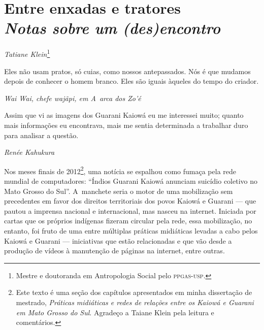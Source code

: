 \thispagestyle{empty}

\chapter*{Entre enxadas e tratores\\ 
\large{\emph{Notas sobre um (des)encontro}}}


\begin{flushright}
\emph{Tatiane Klein}\footnote{Mestre e doutoranda em Antropologia Social pelo
\textsc{ppgas}-\textsc{usp}.}
\end{flushright}

\epigraph{Eles não usam pratos, só cuias, como nossos antepassados. Nós é que
mudamos depois de conhecer o homem branco. Eles são iguais àqueles do
tempo do criador.}{\emph{Wai Wai, chefe wajãpi, em \emph{A~arca dos Zo’é}}}

\begin{samepage}
\epigraph{Assim que vi as imagens dos Guarani Kaiowá eu me interessei muito;
quanto mais informações eu encontrava, mais me sentia determinada a
trabalhar duro para analisar a questão.\footnotemark[2]}{\emph{Renée Kahukura}\footnotemark[3]}
\nopagebreak
\noindent Nos meses finais de 2012\footnote[4]{Este texto é uma seção dos capítulos
apresentados em minha dissertação de mestrado, \emph{Práticas midiáticas e
redes de relações entre os Kaiowá e Guarani em Mato Grosso do Sul}.
Agradeço a Taiane Klein pela leitura e comentários.}, uma notícia se
espalhou como fumaça pela rede mundial de computadores: ``Índios Guarani
Kaiowá anunciam suicídio coletivo no Mato Grosso do Sul''. A~manchete
seria o motor de uma mobilização sem precedentes em favor dos direitos
territoriais dos povos Kaiowá e Guarani --- que pautou a imprensa
nacional e internacional, mas nasceu na internet. Iniciada por cartas
que os próprios indígenas fizeram circular pela rede, essa mobilização,
no entanto, foi fruto de uma entre múltiplas práticas midiáticas
levadas a cabo pelos Kaiowá e Guarani --- iniciativas que estão
relacionadas e que vão desde a produção de vídeos à manutenção de
páginas na internet, entre outras. 
\end{samepage}

